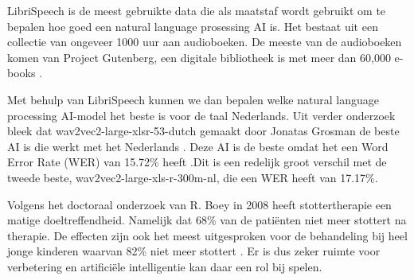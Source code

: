 LibriSpeech is de meest gebruikte data die als maatstaf wordt gebruikt om te bepalen hoe goed een natural language prosessing AI is. Het bestaat uit een collectie van ongeveer 1000 uur aan audioboeken. De meeste van de audioboeken komen van Project Gutenberg, een digitale bibliotheek is met meer dan 60,000 e-books \autocite{7178964}.\par

Met behulp van LibriSpeech kunnen we dan bepalen welke natural language processing AI-model het beste is voor de taal Nederlands. Uit verder onderzoek bleek dat wav2vec2-large-xlsr-53-dutch gemaakt door Jonatas Grosman de beste AI is die werkt met het Nederlands \autocite{Grosman2021}. Deze AI is de beste omdat het een Word Error Rate (WER) van 15.72\% heeft .Dit is een redelijk groot verschil met de tweede beste, wav2vec2-large-xls-r-300m-nl, die een WER heeft van 17.17\%.\par

Volgens het doctoraal onderzoek van R. Boey in 2008 heeft stottertherapie een matige doeltreffendheid. Namelijk dat 68\% van de patiënten niet meer stottert na therapie. De effecten zijn ook het meest uitgesproken voor de behandeling bij heel jonge kinderen waarvan 82\% niet meer stottert \textcite{Boey2008}. Er is dus zeker ruimte voor verbetering en artificiële intelligentie kan daar een rol  bij spelen. 

